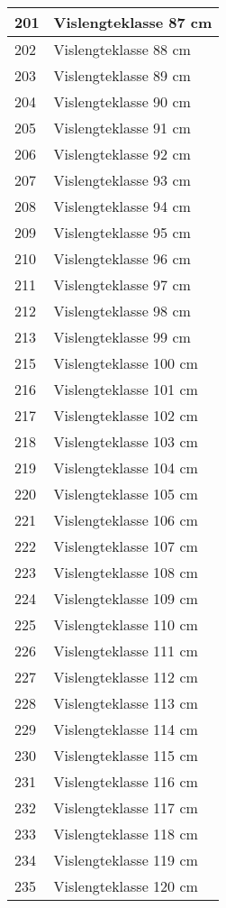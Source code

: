 \documentclass[
]{book}
\begin{document}
\begin{table}
\begin{tabular}[t]{l|l}
\hline
201 & Vislengteklasse 87 cm\\
\hline
202 & Vislengteklasse 88 cm\\
\hline
203 & Vislengteklasse 89 cm\\
\hline
204 & Vislengteklasse 90 cm\\
\hline
205 & Vislengteklasse 91 cm\\
\hline
206 & Vislengteklasse 92 cm\\
\hline
207 & Vislengteklasse 93 cm\\
\hline
208 & Vislengteklasse 94 cm\\
\hline
209 & Vislengteklasse 95 cm\\
\hline
210 & Vislengteklasse 96 cm\\
\hline
211 & Vislengteklasse 97 cm\\
\hline
212 & Vislengteklasse 98 cm\\
\hline
213 & Vislengteklasse 99 cm\\
\hline
215 & Vislengteklasse 100 cm\\
\hline
216 & Vislengteklasse 101 cm\\
\hline
217 & Vislengteklasse 102 cm\\
\hline
218 & Vislengteklasse 103 cm\\
\hline
219 & Vislengteklasse 104 cm\\
\hline
220 & Vislengteklasse 105 cm\\
\hline
221 & Vislengteklasse 106 cm\\
\hline
222 & Vislengteklasse 107 cm\\
\hline
223 & Vislengteklasse 108 cm\\
\hline
224 & Vislengteklasse 109 cm\\
\hline
225 & Vislengteklasse 110 cm\\
\hline
226 & Vislengteklasse 111 cm\\
\hline
227 & Vislengteklasse 112 cm\\
\hline
228 & Vislengteklasse 113 cm\\
\hline
229 & Vislengteklasse 114 cm\\
\hline
230 & Vislengteklasse 115 cm\\
\hline
231 & Vislengteklasse 116 cm\\
\hline
232 & Vislengteklasse 117 cm\\
\hline
233 & Vislengteklasse 118 cm\\
\hline
234 & Vislengteklasse 119 cm\\
\hline
235 & Vislengteklasse 120 cm\\

\end{tabular}
\end{table}
\end{document}
